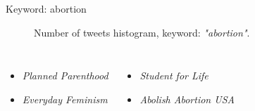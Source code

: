 \documentclass[notheorems,12pt]{beamer}
\begin{document}
\begin{frame}{Keyword: abortion}
    \vspace{-1cm}
    \begin{figure}
        \centering
        \hspace{-0.5cm}
        \vspace{-0.7cm}
        \caption*{Number of tweets histogram, keyword: \textit{"abortion"}.}
    \end{figure}
    \vspace{-0.3cm}
    \begin{columns}
    \column{6cm}
    	\begin{itemize}
    		\item \textit{Planned Parenthood}
    		\item \textit{Everyday Feminism}
    	\end{itemize}
    \column{6cm}
    	\begin{itemize}
    		\item \textit{Student for Life}
    		\item \textit{Abolish Abortion USA}
    	\end{itemize}
    \end{columns}
\end{frame}
\end{document}

